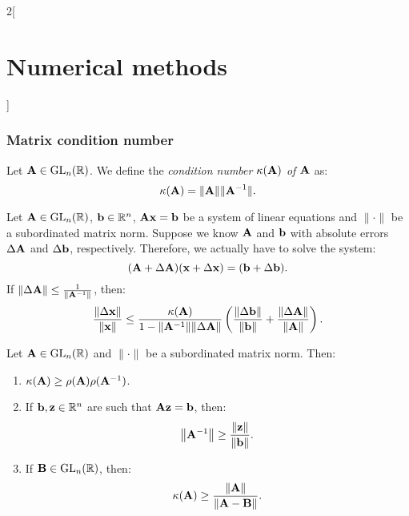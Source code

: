 \documentclass[../../../main.tex]{subfiles}
\begin{document}
\begin{multicols}{2}[\section{Numerical methods}]
\subsubsection*{Matrix condition number}
\begin{definition}
    Let $\vb{A}\in\mathrm{GL}_n(\mathbb{R})$. We define the \textit{condition number $\kappa(\vb{A})$ of $\vb{A}$} as: $$\kappa(\vb{A})=\|\vb{A}\|\|\vb{A}^{-1}\|.$$
\end{definition}
\begin{theorem}
    Let $\vb{A}\in\mathrm{GL}_n(\mathbb{R})$, $\vb{b}\in\mathbb{R}^n$, $\vb{A}\vb{x}=\vb{b}$ be a system of linear equations and $\|\cdot\|$ be a subordinated matrix norm. Suppose we know $\vb{A}$ and $\vb{b}$ with absolute errors $\Delta\vb{A}$ and $\Delta\vb{b}$, respectively. Therefore, we actually have to solve the system: $$(\vb{A}+\Delta\vb{A})(\vb{x}+\Delta \vb{x})=(\vb{b}+\Delta\vb{b}).$$ If $\|\Delta\vb{A}\|\leq\frac{1}{\|\vb{A}^{-1}\|}$, then: $$\frac{\|\Delta \vb{x}\|}{\|\vb{x}\|}\leq\frac{\kappa(\vb{A})}{1-\norm{\vb{A}^{-1}}\norm{\Delta\vb{A}}}\left(\frac{\norm{\Delta\vb{b}}}{\norm{\vb{b}}}+\frac{\norm{\Delta\vb{A}}}{\norm{\vb{A}}}\right).$$
\end{theorem}
\begin{theorem}
    Let $\vb{A}\in\mathrm{GL}_n(\mathbb{R})$ and $\|\cdot\|$ be a subordinated matrix norm. Then:
    \begin{enumerate}
        \item $\kappa(\vb{A})\geq\rho(\vb{A})\rho(\vb{A}^{-1})$.
        \item If $\vb{b},\vb{z}\in\mathbb{R}^n$ are such that $\vb{A}\vb{z}=\vb{b}$, then: $$\norm{\vb{A}^{-1}}\geq\frac{\norm{\vb{z}}}{\norm{\vb{b}}}.$$
        \item If $\vb{B}\in\mathrm{GL}_n(\mathbb{R})$, then: $$\kappa(\vb{A})\geq\frac{\norm{\vb{A}}}{\norm{\vb{A}-\vb{B}}}.$$
    \end{enumerate}
\end{theorem}

\end{multicols}
\end{document}
